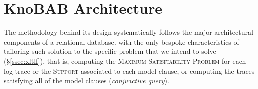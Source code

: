 \section{KnoBAB Architecture}\label{sec:karch}
The methodology behind its design systematically follows the major architectural components of a relational database, with the only bespoke characteristics of tailoring such solution to the specific problem that we intend to solve (\S\ref{ssec:xltlf}), that is, computing the \textsc{Maximum-Satisfiability Problem} for each log trace or the \textsc{Support} associated to each model clause, or computing the traces satisfying all of the model clauses (\textit{conjunctive query}).

